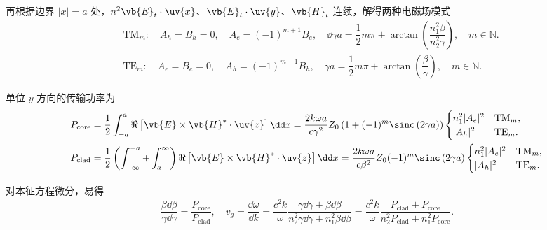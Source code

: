 再根据边界 \(|x| = a\) 处，\(n^2 \vb{E}_t \cdot \uv{x}\)、\(\vb{E}_t \cdot \uv{y}\)、\(\vb{H}_t\) 连续，解得两种电磁场模式
\begin{align*}
	&\text{TM}_m:\quad A_h = B_h = 0,\quad A_e = (-1)^{m+1} B_e,\quad\dd \gamma a = \dfrac{1}{2} m\pi + \arctan\left( \dfrac{n_1^2 \beta}{n_2^2 \gamma} \right),\quad m \in \mathbb{N}.\\
	&\text{TE}_m:\quad A_e = B_e = 0,\quad A_h = (-1)^{m+1} B_h,\quad \gamma a = \dfrac{1}{2} m\pi + \arctan\left( \dfrac{\beta}{\gamma} \right),\quad m \in \mathbb{N}.
\end{align*}

单位 \(y\) 方向的传输功率为
\begin{align*}
	P_{\text{core}} &= \dfrac{1}{2} \int_{-a}^a \Re \left[ \vb{E} \times \vb{H}^* \cdot \uv{z} \right] \dd x = \dfrac{2 k\omega a}{c \gamma^2} Z_0 \left( 1 + (-1)^m \sinc\left(2\gamma a\right) \right)
	\begin{cases}
		n_1^2 |A_e|^2 & \text{TM}_m, \\
		|A_h|^2       & \text{TE}_m.
	\end{cases}\\
	P_{\text{clad}} &= \dfrac{1}{2} \left( \int_{-\infty}^{-a} + \int_a^\infty \right) \Re \left[ \vb{E} \times \vb{H}^* \cdot \uv{z} \right] \dd x = \dfrac{2 k\omega a}{c \beta^2} Z_0 (-1)^m \sinc\left(2\gamma a\right)
	\begin{cases}
		n_1^2 |A_e|^2 & \text{TM}_m, \\
		|A_h|^2       & \text{TE}_m.
	\end{cases}
\end{align*}

对本征方程微分，易得
\begin{align*}
	\dfrac{\beta \dd \beta}{\gamma \dd \gamma} = \dfrac{P_{\text{core}}}{P_{\text{clad}}}, \quad v_g = \dfrac{\dd \omega}{\dd k} = \dfrac{c^2 k}{\omega} \dfrac{\gamma \dd \gamma + \beta \dd \beta}{n_2^2 \gamma \dd \gamma + n_1^2 \beta \dd \beta} = \dfrac{c^2 k}{\omega} \dfrac{P_{\text{clad}} + P_{\text{core}}}{n_2^2 P_{\text{clad}} + n_1^2 P_{\text{core}}}.
\end{align*}

